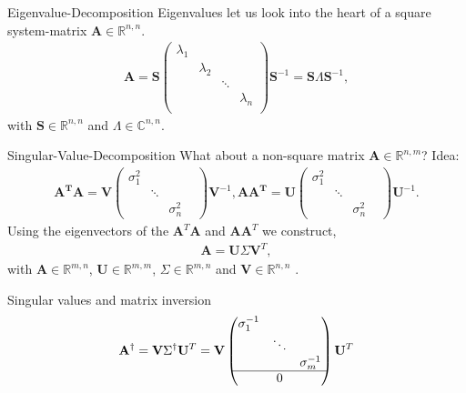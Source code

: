 \documentclass[notes=only]{beamer}
\begin{document}
  \begin{frame}{Eigenvalue-Decomposition \cite{strang2009introduction}}
  Eigenvalues let us look into the heart of a square system-matrix $\mathbf{A} \in \mathbb{R}^{n,n}$.
    \begin{align}
      \mathbf{A} 
      = \mathbf{S}\begin{pmatrix}
        \lambda_1 & & & \\
        & \lambda_2 & & \\
        & & \ddots    & \\
        & & & \lambda_n \\     
      \end{pmatrix}
      \mathbf{S}^{-1}
      =\mathbf{S}\Lambda \mathbf{S}^{-1},
    \end{align}
    with $\mathbf{S} \in \mathbb{R}^{n,n}$ and $\Lambda \in \mathbb{C}^{n,n}$. 
  \end{frame}

  \begin{frame}{Singular-Value-Decomposition \cite{strang2009introduction}}
    What about a non-square matrix $\mathbf{A} \in \mathbb{R}^{n,m}$? Idea:
    \begin{align}
      \mathbf{A^T}\mathbf{A} = \mathbf{V}
      \begin{pmatrix}
      \sigma_1^2 & & \\
      & \ddots & & \\
      & & \sigma_n^2   
      \end{pmatrix}
      \mathbf{V}^{-1},
      \mathbf{A}\mathbf{A^T} = \mathbf{U}
      \begin{pmatrix}
      \sigma_1^2 & & \\
      & \ddots & & \\
      & & \sigma_n^2   
      \end{pmatrix}
      \mathbf{U}^{-1}.
    \end{align}
    Using the eigenvectors of the $\mathbf{A}^T\mathbf{A}$ and $\mathbf{A}\mathbf{A}^T$ we construct, 
    \begin{align}
      \mathbf{A} = \mathbf{U}\Sigma \mathbf{V}^T,
    \end{align}
    with $\mathbf{A} \in \mathbb{R}^{m,n}$, $\mathbf{U} \in \mathbb{R}^{m,m}$, $\Sigma \in \mathbb{R}^{m,n}$ and $\mathbf{V} \in \mathbb{R}^{n,n}$ .
  \end{frame}

  \begin{frame}{Singular values and matrix inversion \cite{golub1965calculating}}
    \begin{align}
      \mathbf{A}^{\dagger} = \mathbf{V} \Sigma^\dagger \mathbf{U}^T = \mathbf{V} \begin{pmatrix}
      \sigma_1^{-1} & & \\
      & \ddots &  \\
      & & \sigma_m^{-1} \\ \hline 
      & 0 & \\
      \end{pmatrix} \mathbf{U}^T
    \end{align}
  \end{frame}
\end{document}
